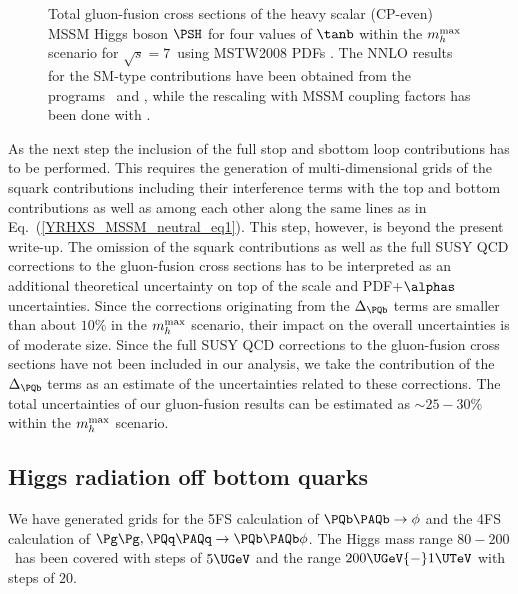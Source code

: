 \begin{figure}[htb]
\caption{\label{YRHXS_MSSM_neutral_fig3} Total gluon-fusion cross
sections of the heavy scalar (CP-even) MSSM Higgs boson $\PSH$ for four values of
$\tanb$ within the $m_h^{\rm max}$ scenario for $\sqrt{s}=7$\UTeV\ using
MSTW2008 PDFs \cite{Martin:2009iq,Martin:2009bu}. The NNLO results for
the SM-type contributions have been obtained from the programs
\HIGLU~and \gghnnlo, while the rescaling with MSSM coupling factors has
been done with \FeynHiggs.}
\end{figure}

As the next step the inclusion of the full stop and sbottom loop
contributions has to be performed. This requires the generation of
multi-dimensional grids of the squark contributions including their
interference terms with the top and bottom contributions as well as
among each other along the same lines as in
Eq.~(\ref{YRHXS_MSSM_neutral_eq1}). This step, however, is beyond the
present write-up. The omission of the squark contributions as well as
the full SUSY QCD corrections to the gluon-fusion cross sections has to
be interpreted as an additional theoretical uncertainty on top of the
scale and PDF+$\alphas$ uncertainties. Since the corrections originating
from the $\Delta_{\PQb}$ terms are smaller than about $10\%$ in the
$m_h^{\rm max}$ scenario, their impact on the overall uncertainties is of
moderate size. Since the full SUSY QCD corrections to the gluon-fusion
cross sections have not been included in our analysis, we take the
contribution of the $\Delta_{\PQb}$ terms as an estimate of the
uncertainties related to these corrections. The total uncertainties of
our gluon-fusion results can be estimated as $\sim 25{-}30\%$ within the
$m_h^{\rm max}$ scenario.


\subsection{Higgs radiation off bottom quarks}
We have generated grids for the 5FS calculation of $\PQb\PAQb\to\phi$
and the 4FS calculation of $\Pg\Pg,\PQq\PAQq\to \PQb\PAQb\phi$. The
Higgs mass range $80{-}200$\UGeV\ has been covered with steps of $5\UGeV$ and
the range $200\UGeV{-}1\UTeV$ with steps of $20$\UGeV.

